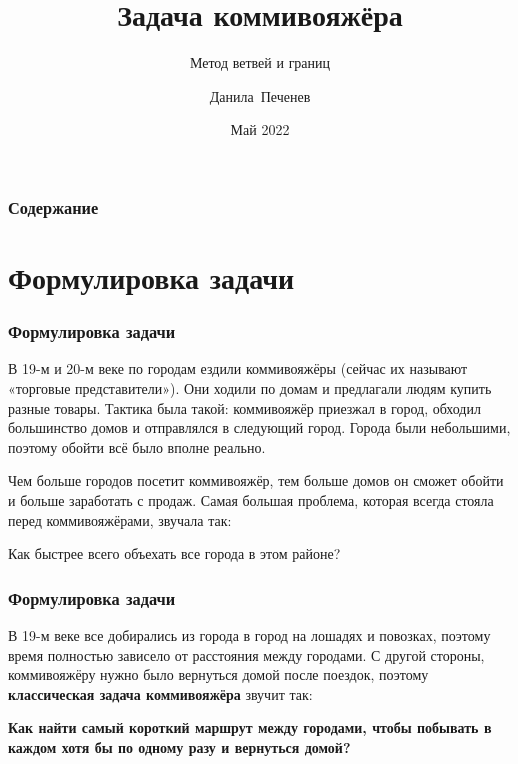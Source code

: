 \documentclass{beamer}
\title[Задача коммивояжёра] %
{Задача коммивояжёра}
\subtitle{Метод ветвей и границ}
\author[Данила Печенев] %
{Данила~Печенев}
\institute[] %
{
  Программмная инженерия\\
  Математико-механический факультет\\
  СПбГУ
}
\date[Май 2022] %
{Май 2022}
\begin{document}
\frame{\titlepage}


\begin{frame}
\frametitle{Содержание}
\tableofcontents
\end{frame}


\section{Формулировка задачи}

\begin{frame}
\frametitle{Формулировка задачи}
В 19-м и 20-м веке по городам ездили коммивояжёры (сейчас их называют «торговые представители»). Они ходили по домам и предлагали людям купить разные товары. Тактика была такой: коммивояжёр приезжал в город, обходил большинство домов и отправлялся в следующий город. Города были небольшими, поэтому обойти всё было вполне реально.

Чем больше городов посетит коммивояжёр, тем больше домов он сможет обойти и больше заработать с продаж. Самая большая проблема, которая всегда стояла перед коммивояжёрами, звучала так:

\begin{center}
  Как быстрее всего объехать все города в этом районе?
\end{center}

\end{frame}


\begin{frame}
\frametitle{Формулировка задачи}
В 19-м веке все добирались из города в город на лошадях и повозках, поэтому время полностью зависело от расстояния между городами. С другой стороны, коммивояжёру нужно было вернуться домой после поездок, поэтому \textbf{классическая задача коммивояжёра} звучит так:

\begin{center}
\textbf{Как найти самый короткий маршрут между городами, чтобы побывать в каждом хотя бы по одному разу и вернуться домой?}
\end{center}
\end{frame}

\end{document}
